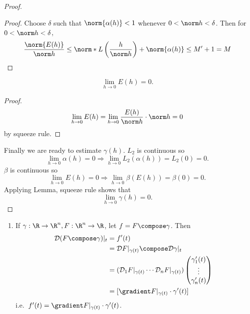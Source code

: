 \documentclass[a4paper]{article}
\newcommand*{\D}{\mathcal{D}}
\theoremstyle{definition}
\begin{document}
\begin{proof}
\begin{proof}
  Choose \(\delta\) such that \(\norm{\alpha(h)} < 1\) whenever \(0 < \norm h < \delta\). Then for \(0 < \norm h < \delta\),
  \[
    \frac{\norm{E(h)}}{\norm h} \leq \norm*{L\left( \frac{h}{\norm h} \right)} + \norm{\alpha(h)} \leq M' + 1 = M
  \]
  \end{proof}

  \begin{corollary}
    \[
      \lim_{h \to 0} E(h) = 0.
    \]
  \end{corollary}

  \begin{proof}
    \[
      \lim_{h \to 0} E(h) = \lim_{h \to 0} \frac{E(h)}{\norm h} \cdot \norm h = 0
    \]
    by squeeze rule.
  \end{proof}

  Finally we are ready to estimate \(\gamma(h)\). \(L_2\) is continuous so
  \[
    \lim_{h \to 0} \alpha(h) = 0 \Rightarrow \lim_{h \to 0} L_2(\alpha(h)) = L_2(0) = 0.
  \]
  \(\beta\) is continuous so
  \[
    \lim_{h \to 0} E(h) = 0 \Rightarrow \lim_{h \to 0} \beta(E(h)) = \beta(0) = 0.
  \]
  Applying Lemma, squeeze rule shows that
  \[
    \lim_{h \to 0} \gamma(h) = 0.
  \]
\end{proof}

\begin{remark}\leavevmode
  \begin{enumerate}
  \item If \(\gamma: \R \to \R^n, F: \R^n \to \R\), let \(f = F \compose \gamma\). Then
    \begin{align*}
      \D (F \compose \gamma)|_t &= f'(t) \\
                                &=\D F|_{\gamma(t)} \compose \D \gamma|_t \\
                                &= (\D_1 F|_{\gamma(t)} \cdots \D_n F|_{\gamma(t)})
                                  \begin{pmatrix}
                                    \gamma_1'(t) \\
                                    \vdots \\
                                    \gamma_n'(t)
                                  \end{pmatrix}\\
                                &= [\gradient F|_{\gamma(t)} \cdot \gamma'(t)]
    \end{align*}
    i.e.\ \(f'(t) = \gradient F|_{\gamma(t)} \cdot \gamma'(t)\).
  \end{enumerate}
\end{remark}
\end{document}
